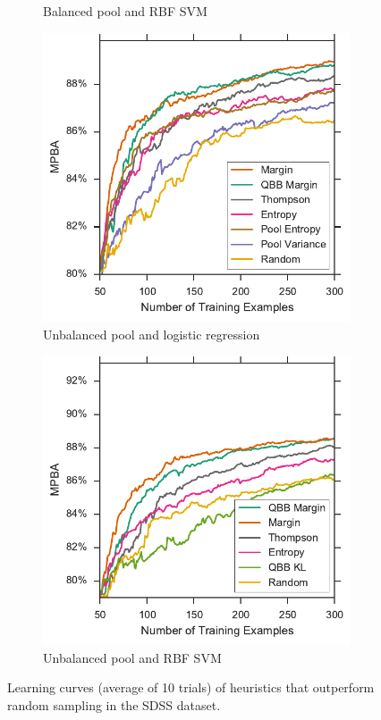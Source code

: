 \begin{figure}[p]
\begin{subfigure}{.5\textwidth}
		\caption{Balanced pool and RBF SVM}
		\label{fig:sdss_br_ind_upper}
	\end{subfigure}
	\begin{subfigure}{.5\textwidth}
		\centering
		\includegraphics[width=\textwidth]{figures/5_active/sdss_ul_ind_upper}
		\caption{Unbalanced pool and logistic regression}
		\label{fig:sdss_ul_ind_upper}
	\end{subfigure}%
	\begin{subfigure}{.5\textwidth}
		\centering
		\includegraphics[width=\linewidth]{figures/5_active/sdss_ur_ind_upper}
		\caption{Unbalanced pool and RBF SVM}
		\label{fig:sdss_ur_ind_upper}
	\end{subfigure}
	\caption[Learning curves of heuristics better than random (SDSS)]{
		Learning curves (average of 10 trials) of heuristics that outperform random sampling in the SDSS dataset.}
	\label{fig:sdss_ind_upper}
\end{figure}


